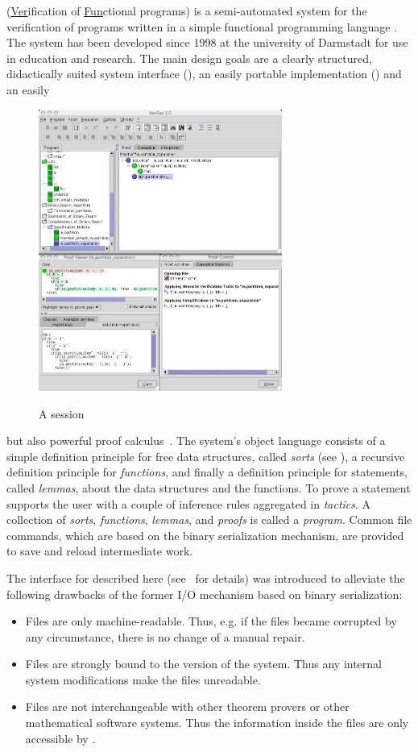 {\verifun} (\underline{Ver}ification of \underline{Fun}ctional programs) is a
semi-automated system for the verification of programs written in a simple functional
programming language {\fp}. The system has been developed since 1998 at the university of
Darmstadt for use in education and research. The main design goals are a clearly
structured, didactically suited system interface (), an easily portable
implementation ({\java}) and an easily
\begin{figure}\vspace*{-.3cm}
  \includegraphics[width=8cm]{projects/verifun/verifun}
  \label{fig:verifun}\caption{A {\verifun} session}\vspace*{-.3cm}
\end{figure}
but also powerful proof calculus~\cite{WS:VFTut}. The system's object language consists of
a simple definition principle for free data structures, called {\emph{sorts}} (see
{}), a recursive definition principle for {\emph{functions}}, and finally a
definition principle for statements, called {\emph{lemmas}}, about the data structures and
the functions. To prove a statement {\verifun} supports the user with a couple of
inference rules aggregated in {\emph{tactics}}. A collection of {\emph{sorts}},
{\emph{functions}}, {\emph{lemmas}}, and {\emph{proofs}} is called a {\verifun}
{\emph{program}}. Common file commands, which are based on the {\java} binary
serialization mechanism, are provided to save and reload intermediate work.

The {\omdoc} interface for {\verifun} described here (see~\cite{NRM:DA05} for details) was
introduced to alleviate the following drawbacks of the former I/O mechanism based on
{\java} binary serialization:
\begin{itemize}
\item Files are only machine-readable. Thus, e.g. if the files became corrupted by any
  circumstance, there is no change of a manual repair.
\item Files are strongly bound to the version of the system. Thus any internal system
  modifications make the files unreadable.
\item Files are not interchangeable with other theorem provers or other mathematical
  software systems. Thus the information inside the files are only accessible by
  {\verifun}.
\end{itemize}

